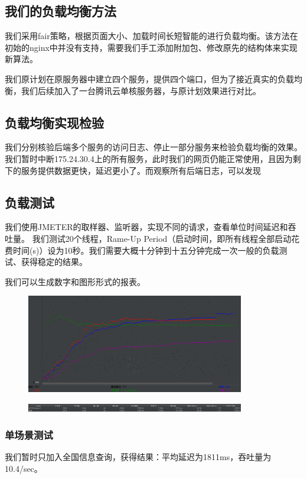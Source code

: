 \documentclass{article}
\begin{document}
\subsection{我们的负载均衡方法}
我们采用fair策略，根据页面大小、加载时间长短智能的进行负载均衡。该方法在初始的nginx中并没有支持，需要我们手工添加附加包、修改原先的结构体来实现新算法。

我们原计划在原服务器中建立四个服务，提供四个端口，但为了接近真实的负载均衡，我们后续加入了一台腾讯云单核服务器，与原计划效果进行对比。



\subsection{负载均衡实现检验}
我们分别核验后端多个服务的访问日志、停止一部分服务来检验负载均衡的效果。
我们暂时中断175.24.30.4上的所有服务，此时我们的网页仍能正常使用，且因为剩下的服务提供数据更快，延迟更小了。而观察所有后端日志，可以发现

\subsection{负载测试}
我们使用JMETER的取样器、监听器，实现不同的请求，查看单位时间延迟和吞吐量。
我们测试20个线程，Rame-Up Period（启动时间，即所有线程全部启动花费时间(s)）设为10秒。我们需要大概十分钟到十五分钟完成一次一般的负载测试、获得稳定的结果。

我们可以生成数字和图形形式的报表。
\begin{figure}[H]
\centering
\includegraphics[width=0.85\textwidth]{progress-report-3/graph.png}
\end{figure}
\begin{figure}[H]
\centering
\includegraphics[width=0.85\textwidth]{progress-report-3/figure.png}
\end{figure}
\subsubsection{单场景测试}
我们暂时只加入全国信息查询，获得结果：平均延迟为1811ms，吞吐量为10.4/sec。
\end{document}
